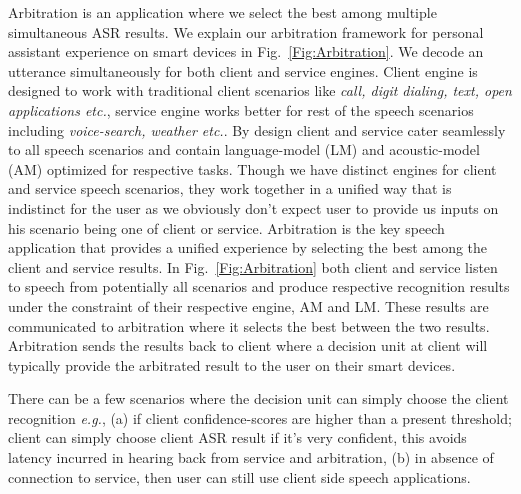 Arbitration is an application where we select the best among multiple simultaneous ASR results. We explain our arbitration framework for personal assistant experience on smart devices in Fig.~\ref{Fig:Arbitration}. We decode an utterance simultaneously for both client and service engines. Client engine is designed to work with traditional client scenarios like \emph{call, digit dialing, text, open applications etc.}, service engine works better for rest of the speech scenarios including \emph{voice-search, weather etc.}. By design client and service cater seamlessly to all speech scenarios and contain language-model (LM) and acoustic-model (AM) optimized for respective tasks. Though we have distinct engines for client and service speech scenarios, they work together in a unified way that is indistinct for the user as we obviously don't expect user to provide us inputs on his scenario being one of client or service. Arbitration is the key speech application that provides a unified experience by selecting the best among the client and service results.  In Fig.~\ref{Fig:Arbitration} both client and service listen to speech from potentially all scenarios and produce respective recognition results under the constraint of their respective engine, AM and LM. These results are communicated to arbitration where it selects the best between the two results. Arbitration sends the results back to client where a decision unit at client will typically provide the arbitrated result to the user on their smart devices.

There can be a few scenarios where the decision unit can simply choose the client recognition \emph{e.g.}, (a) if client confidence-scores are higher than a present threshold; client can simply choose client ASR result if it's very confident, this avoids latency incurred in hearing back from service and arbitration, (b) in absence of connection to service, then user can still use client side speech applications. %



